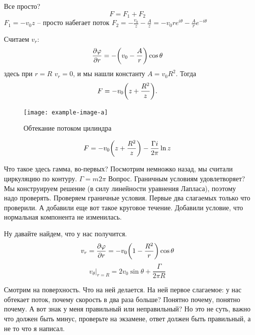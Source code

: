 Все просто?
\begin{equation}
	F=F_1+F_2
\end{equation}
$F_1=-v_0z$ -- просто набегает поток
$F_2=-\frac{v_0}{z}-\frac{A}{z}=-v_0r e^{i\theta} -\frac{A}{r} e^{-i\theta}$

Считаем $v_r$:
\begin{equation}
	\pdv{\varphi}{r}=-\qty(v_0-\frac{A}{r})\cos\theta
\end{equation}
здесь при $r=R$ $v_r=0$, и мы нашли константу $A=v_0R^2$.
Тогда
\begin{equation}
	F=-v_0\qty(z+\frac{R^2}{z}).
\end{equation}
\begin{figure}[h!]
    \centering
    \texttt{[image: example-image-a]}
    \caption{Обтекание потоком цилиндра}
    \label{fig:figure1}
\end{figure}

\begin{equation}
	F=-v_0\qty(z+\frac{R^2}{z})-\frac{\Gamma i}{2\pi}\ln{z}
\end{equation}

Что такое здесь гамма, во-первых? Посмотрим немножко назад, мы считали циркуляцию по контуру. $\Gamma=m 2\pi$ Вопрос. Граничным условиям удовлетворяет? Мы конструируем решение (в силу линейности уравнения Лапласа), поэтому надо проверять. Проверяем граничные условия. Первые два слагаемых только что проверили. А добавили еще вот такое круговое течение. Добавили условие, что нормальная компонента не изменилась.

Ну давайте найдем, что у нас получится.
\begin{equation}
	v_r=\pdv{\varphi}{r}=-v_0\qty(1-\frac{R^2}{r})\cos\theta
\end{equation}
\begin{equation}
	v_\theta\bigg|_{r=R}=2v_0\sin\theta+\frac{\Gamma}{2\pi R}
\end{equation}

Смотрим на поверхность. Что на ней делается. На ней первое слагаемое: у нас обтекает поток, почему скорость в два раза больше? Понятно почему, понятно почему. А вот знак у меня правильный или неправильный? Но это не суть, важно что должен быть минус, проверьте на экзамене, ответ должен быть правильный, а не то что я написал.

